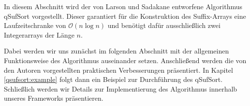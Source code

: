 
In diesem Abschnitt wird der von Larson und Sadakane entworfene Algorithmus qSufSort \cite{saca:1} vorgestellt. 
Dieser garantiert für die Konstruktion des Suffix-Arrays eine Laufzeitschranke von $\mathcal{O}(n\log n)$ und benötigt dafür ausschließlich zwei Integerarrays der Länge $n$.

Dabei werden wir uns zunächst im folgenden Abschnitt mit der allgemeinen Funktionsweise des Algorithmus auseinander setzen. Anschließend werden die von den Autoren vorgestellten praktischen Verbesserungen präsentiert. In Kapitel \ref{qsufsort:example} folgt dann ein Beispiel zur Durchführung des qSufSort. Schließlich werden wir Details zur Implementierung des Algorithmus innerhalb unseres Frameworks präsentieren.
